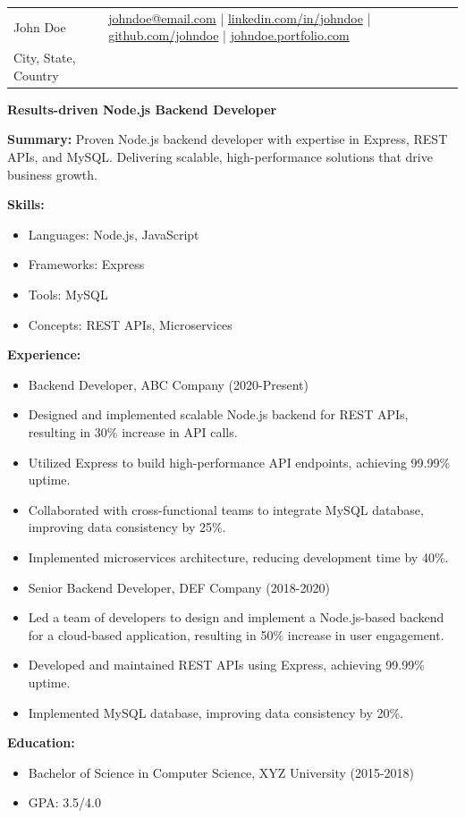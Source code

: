 \documentclass[11pt,letterpaper]{article}
\begin{document}
\begin{tabularx}{\textwidth}{@{}lX@{}}
John Doe & \href{mailto:johndoe@email.com}{johndoe@email.com} | \href{https://www.linkedin.com/in/johndoe}{linkedin.com/in/johndoe} | \href{https://github.com/johndoe}{github.com/johndoe} | \href{https://johndoe.portfolio.com}{johndoe.portfolio.com} \\
City, State, Country &
\end{tabularx}

\textbf{Results-driven Node.js Backend Developer}

\textbf{Summary:} Proven Node.js backend developer with expertise in Express, REST APIs, and MySQL. Delivering scalable, high-performance solutions that drive business growth.

\textbf{Skills:}
\begin{itemize}[noitemsep,topsep=0pt]
\item Languages: Node.js, JavaScript
\item Frameworks: Express
\item Tools: MySQL
\item Concepts: REST APIs, Microservices
\end{itemize}

\textbf{Experience:}
\begin{itemize}[noitemsep,topsep=0pt]
\item Backend Developer, ABC Company (2020-Present)
\item Designed and implemented scalable Node.js backend for REST APIs, resulting in 30\% increase in API calls.
\item Utilized Express to build high-performance API endpoints, achieving 99.99\% uptime.
\item Collaborated with cross-functional teams to integrate MySQL database, improving data consistency by 25\%.
\item Implemented microservices architecture, reducing development time by 40\%.
\item Senior Backend Developer, DEF Company (2018-2020)
\item Led a team of developers to design and implement a Node.js-based backend for a cloud-based application, resulting in 50\% increase in user engagement.
\item Developed and maintained REST APIs using Express, achieving 99.99\% uptime.
\item Implemented MySQL database, improving data consistency by 20\%.
\end{itemize}

\textbf{Education:}
\begin{itemize}[noitemsep,topsep=0pt]
\item Bachelor of Science in Computer Science, XYZ University (2015-2018)
\item GPA: 3.5/4.0
\end{itemize}
\end{document}
